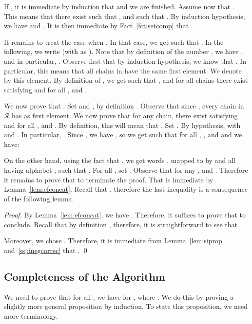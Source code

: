 \documentclass[envcountsame]{llncs}
\newcommand\Rs{\ensuremath{\mathcal{R}}\xspace}
\newcommand\chain{chain\xspace}
\newcommand\chains{chains\xspace}
\begin{document}
If , it is immediate by induction that  and we are finished. Assume now that . This means that there exist  such that ,
 and  such that . By induction hypothesis, we have  and . It is
then immediate by Fact~\ref{fct:setcomp} that .

It remains to treat the case when . In that case, we
get  such that . In the following, we
write  (with  as
). Note that by definition of the number , we have
, and in particular, . Observe first that by
induction hypothesis, we know that . In
particular, this means that all \chains in  have the same first
element. We denote by  this element. By definition of
, we get  such that ,  and for all \chains 
there exist  satisfying  and for all ,  and
. 

\smallskip We now prove that . Set  and , by definition . Observe that since , every \chain in \Rs has  as first element. We now
prove that for any \chain , there exist
 satisfying  and for all ,  and . By
definition, this will mean that . Set
. By hypothesis,  with 
 and . In particular, . Since , we have
, so we get
 such that for all ,
,  and
 and we have:

On the other hand, using the fact that , we get words , mapped to
 by  and all having alphabet , such that . For all , set . Observe that for any ,  
and . Therefore it remains to prove that  to terminate the
proof. That  is immediate by
Lemma~\ref{lem:efconcat}. Recall that , therefore the
last inequality is a consequence of the following lemma.

\begin{lemma} \label{lem:efcorrec}
  
\end{lemma}


\begin{proof}
  By Lemma~\ref{lem:efconcat}, we have . Therefore, it suffices to prove that  to conclude. Recall that by definition
  , therefore, it is straightforward to
  see that 

  

  Moreover, we chose . Therefore, it is immediate from Lemma~\ref{lem:siprop}
  and~\eqref{eq:inegcorrec} that . \qed 
\end{proof}

\subsection{Completeness of the Algorithm}
We need to prove that for all , we have
 for , where . We do this by proving a slightly more general
proposition by induction. To state this proposition, we need more
terminology.
\end{document}
